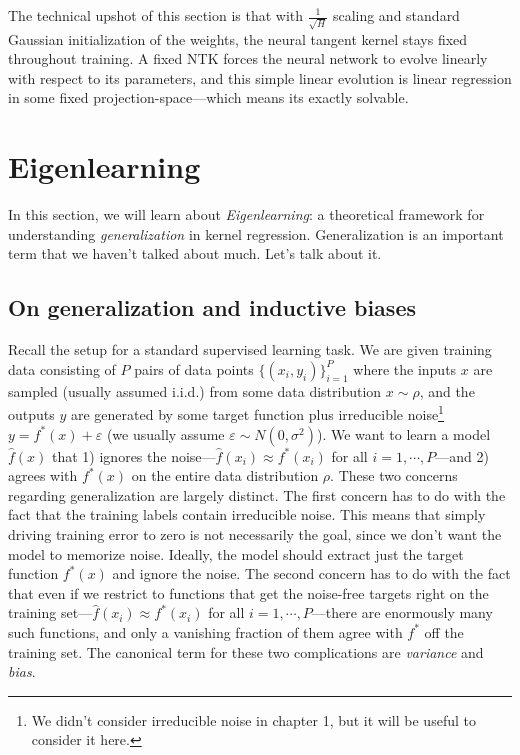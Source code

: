 The technical upshot of this section is that with $\frac{1}{\sqrt{H}}$ scaling and standard Gaussian initialization of the weights, the neural tangent kernel stays fixed throughout training. A fixed NTK forces the neural network to evolve linearly with respect to its parameters, and this simple linear evolution is linear regression in some fixed projection-space---which means its exactly solvable.

\section{Eigenlearning}

In this section, we will learn about \textit{Eigenlearning}: a theoretical framework
for understanding \textit{generalization} in kernel regression.
Generalization is an important term that we haven't talked about much.
Let's talk about it.

\subsection{On generalization and inductive biases}

Recall the setup for a standard supervised learning task. We are given training data consisting of
$P$ pairs of data points $\{ (x_{i}, y_{i}) \}_{i=1}^P$ where the inputs $x$ are sampled (usually assumed i.i.d.) from some data distribution $x\sim \rho$, and
the outputs $y$ are generated by some target function plus irreducible noise\footnote{We didn't consider irreducible noise in chapter 1, but it will be useful to consider it here.} $y=f^*(x)+\varepsilon$ (we usually assume $\varepsilon\sim N(0,\sigma^2)$).
We want to learn a model $\hat{f}(x)$ that 1) ignores the noise---$\hat{f}(x_{i}) \approx f^*(x_i)$
for all $i = 1,\cdots, P$---and 2) agrees with $f^*(x)$ on the entire data distribution $\rho$. These two concerns regarding generalization are largely distinct. The first concern has to do with the fact that the training labels contain irreducible noise. This means that simply driving training error to zero is not necessarily the goal, since we don't want the model to memorize noise. Ideally, the model should extract just the target function $f^*(x)$ and ignore the noise. The second concern has to do with the fact that even if we restrict to functions that get the noise-free targets right on the training set---$\hat{f}(x_{i}) \approx f^*(x_i)$ for all $i = 1,\cdots, P$---there are enormously many such functions, and only a vanishing fraction of them agree with $f^*$ off the training set. The canonical term for these two complications are \textit{variance} and \textit{bias}.
 
